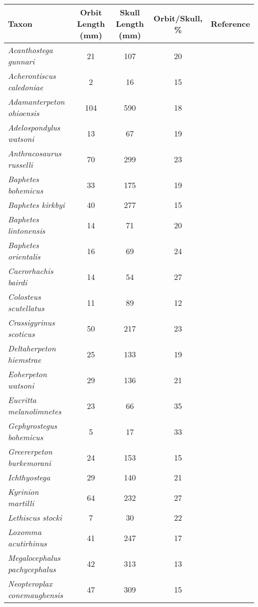 \begin{tabular}{|L{4.5cm}|c|c|c|L{4.5cm}|}
\hline
\textbf{Taxon}&\textbf{Orbit Length (mm)}&\textbf{Skull Length (mm)}&\textbf{Orbit/Skull, \%}&\textbf{Reference}\\\hline
\textit{Acanthostega gunnari}&21&107&20&\citet{Clac02b,Porr15a}\\\hline
\textit{Acherontiscus caledoniae}&2&16&15&\citet{Carr69a}\\\hline
\textit{Adamanterpeton ohioensis}&104&590&18&\citet{Miln98a}\\\hline
\textit{Adelospondylus watsoni}&13&67&19&\citet{Carr67a}\\\hline
\textit{Anthracosaurus russelli}&70&299&23&\citet{Panc77a}\\\hline
\textit{Baphetes bohemicus}&33&175&19&\citet{Beau77a}\\\hline
\textit{Baphetes kirkbyi}&40&277&15&\citet{Beau77a}\\\hline
\textit{Baphetes lintonensis}&14&71&20&\citet{Beau77a}\\\hline
\textit{Baphetes orientalis}&16&69&24&\citet{Miln09a}\\\hline
\textit{Caerorhachis bairdi}&14&54&27&\citet{Holm77a}\\\hline
\textit{Colosteus scutellatus}&11&89&12&\citet{Hook83a}\\\hline
\textit{Crassigyrinus scoticus}&50&217&23&\citet{Panc85a}\\\hline
\textit{Deltaherpeton hiemstrae}&25&133&19&\citet{Bolt10a}\\\hline
\textit{Eoherpeton watsoni}&29&136&21&\citet{Smit85a}\\\hline
\textit{Eucritta melanolimnetes}&23&66&35&\citet{Clac98a}\\\hline
\textit{Gephyrostegus bohemicus}&5&17&33&\citet{Brou67a}\\\hline
\textit{Greererpeton burkemorani}&24&153&15&\citet{Bent90a}\\\hline
\textit{Ichthyostega}&29&140&21&\citet{Bent90a}\\\hline
\textit{Kyrinion martilli}&64&232&27&\citet{Clac03a}\\\hline
\textit{Lethiscus stocki}&7&30&22&\citet{Well82a}\\\hline
\textit{Loxomma acutirhinus}&41&247&17&\citet{Beau77a}\\\hline
\textit{Megalocephalus pachycephalus}&42&313&13&\citet{Beau77a}\\\hline
\textit{Neopteroplax conemaughensis}&47&309&15&\citet{Rome63a}\\\hline

\end{tabular}
